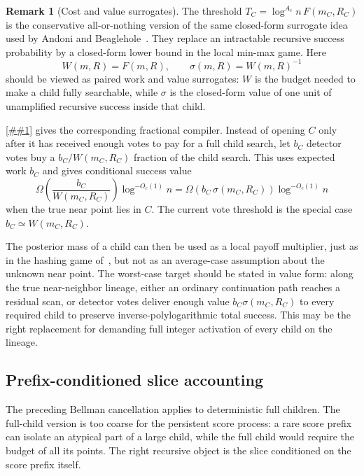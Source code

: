 \documentclass[10pt]{article}
\newcommand{\Cref}[1]{\ref{##1}}
\theoremstyle{definition}
\newtheorem{remark}[theorem]{Remark}
\begin{document}
\begin{remark}[Cost and value surrogates]\label{rem:cost-value-surrogates}
   The threshold $T_C=\log^{A_c}n\,F(m_C,R_C)$ is the conservative all-or-nothing version of the same closed-form surrogate idea used by Andoni and Beaglehole~\cite{AB22}. They replace an intractable recursive success probability by a closed-form lower bound in the local min-max game. Here
   \[
      W(m,R)=F(m,R),
      \qquad
      \sigma(m,R)=W(m,R)^{-1}
   \]
   should be viewed as paired work and value surrogates: $W$ is the budget needed to make a child fully searchable, while $\sigma$ is the closed-form value of one unit of unamplified recursive success inside that child.

   \Cref{lem:fractional-value-budget} gives the corresponding fractional
   compiler. Instead of opening $C$ only after it has received enough votes to
   pay for a full child search, let $b_C$ detector votes buy a
   $b_C/W(m_C,R_C)$ fraction of the child search. This uses expected work
   $b_C$ and gives conditional success value
   \[
      \Omega\!\left(\frac{b_C}{W(m_C,R_C)}\right)\log^{-O_c(1)}n
      =
      \Omega(b_C\,\sigma(m_C,R_C))\log^{-O_c(1)}n
   \]
   when the true near point lies in $C$. The current vote threshold is the special case $b_C\simeq W(m_C,R_C)$.

   The posterior mass of a child can then be used as a local payoff multiplier, just as in the hashing game of~\cite{AB22}, but not as an average-case assumption about the unknown near point. The worst-case target should be stated in value form: along the true near-neighbor lineage, either an ordinary continuation path reaches a residual scan, or detector votes deliver enough value $b_C\sigma(m_C,R_C)$ to every required child to preserve inverse-polylogarithmic total success. This may be the right replacement for demanding full integer activation of every child on the lineage.
\end{remark}

\subsection{Prefix-conditioned slice accounting}

The preceding Bellman cancellation applies to deterministic full children. The full-child version is too coarse for the persistent score process: a rare score prefix can isolate an atypical part of a large child, while the full child would require the budget of all its points. The right recursive object is the slice conditioned on the score prefix itself.
\end{document}
